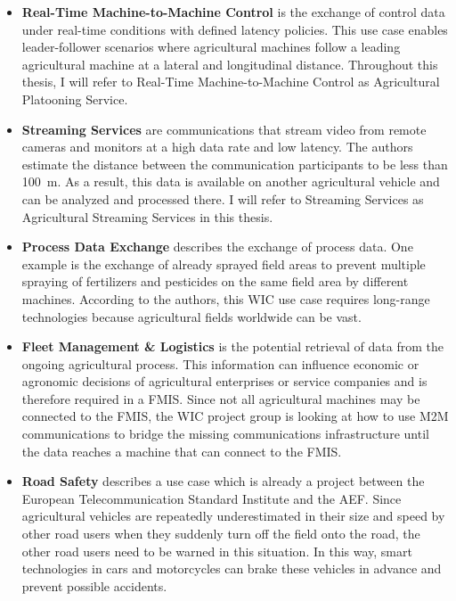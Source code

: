 \begin{itemize}
	\item \textbf{Real-Time Machine-to-Machine Control} is the exchange of control data under real-time conditions with defined latency policies. This use case enables leader-follower scenarios where agricultural machines follow a leading agricultural machine at a lateral and longitudinal distance. Throughout this thesis, I will refer to Real-Time Machine-to-Machine Control as Agricultural Platooning Service.
	\item \textbf{Streaming Services} are communications that stream video from remote cameras and monitors at a high data rate and low latency. The authors estimate the distance between the communication participants to be less than \SI{100}{\metre}. As a result, this data is available on another agricultural vehicle and can be analyzed and processed there. 
	I will refer to Streaming Services as Agricultural Streaming Services in this thesis. %
	\item \textbf{Process Data Exchange} describes the exchange of process data. One example is the exchange of already sprayed field areas to prevent multiple spraying of fertilizers and pesticides on the same field area by different machines. According to the authors, this \ac{WIC} use case requires long-range technologies because agricultural fields worldwide can be vast.
	\item \textbf{Fleet Management \& Logistics} is the potential retrieval of data from the ongoing agricultural process. This information can influence economic or agronomic decisions of agricultural enterprises or service companies and is therefore required in a \ac{FMIS}.
	Since not all agricultural machines may be connected to the \ac{FMIS}, the \ac{WIC} project group is looking at how to use \ac{M2M} communications to bridge the missing communications infrastructure until the data reaches a machine that can connect to the \ac{FMIS}.
	\item \textbf{Road Safety} describes a use case which is already a project between the European Telecommunication Standard Institute and the \ac{AEF}. Since agricultural vehicles are repeatedly underestimated in their size and speed by other road users when they suddenly turn off the field onto the road, the other road users need to be warned in this situation. In this way, smart technologies in cars and motorcycles can brake these vehicles in advance and prevent possible accidents.
\end{itemize}

